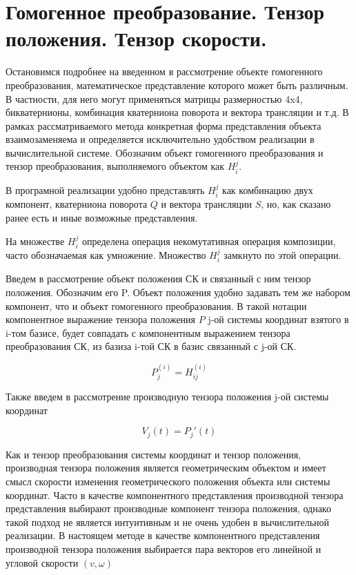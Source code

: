 \section{Гомогенное преобразование. Тензор положения. Тензор скорости.}\label{geom}

Остановимся подробнее на введенном в рассмотрение объекте гомогенного преобразования, математическое представление которого может быть различным. В частности, для него могут применяться матрицы размерностью 4x4, бикватернионы, комбинация кватерниона поворота и вектора трансляции и т.д. В рамках рассматриваемого метода конкретная форма представления объекта взаимозаменяема и определяется исключительно удобством реализации в вычислительной системе. Обозначим объект гомогенного преобразования и тензор преобразования, выполняемого объектом как $H^j_i$. 

В програмной реализации удобно представлять $H^j_i$ как комбинацию двух компонент, кватерниона поворота $Q$ и вектора трансляции $S$, но, как сказано ранее есть и иные возможные представления. 

На множестве $H^j_i$ определена операция некомутативная операция композиции, часто обозначаемая как умножение. Множество $H^j_i$ замкнуто по этой операции.

Введем в рассмотрение объект положения СК и связанный с ним тензор положения. Обозначим его P. Объект положения удобно задавать тем же набором компонент, что и объект гомогенного преобразования. В такой нотации компонентное выражение тензора положения $P$ j-ой системы координат взятого в i-том базисе, будет совпадать с компонентным выражением тензора преобразования СК, из базиза i-той СК в базис связанный с j-ой СК. 

\begin{equation}
P_j^{(i)} = H_{ij}^{(i)}
\end{equation}

Также введем в рассмотрение производную тензора положения j-ой системы координат

\begin{equation}\label{speed_eq} 
V_j(t) = P_j'(t) 
\end{equation}

Как и тензор преобразования системы координат и тензор положения, производная тензора положения является геометрическим объектом и имеет смысл скорости изменения геометрического положения объекта или системы координат. Часто в качестве компонентного представления производной тензора представления выбирают производные компонент тензора положения, однако такой подход не является интуитивным и не очень удобен в вычислительной реализации. В настоящем методе в качестве компонентного представления производной тензора положения выбирается пара векторов его линейной и угловой скорости $(v,\omega)$

